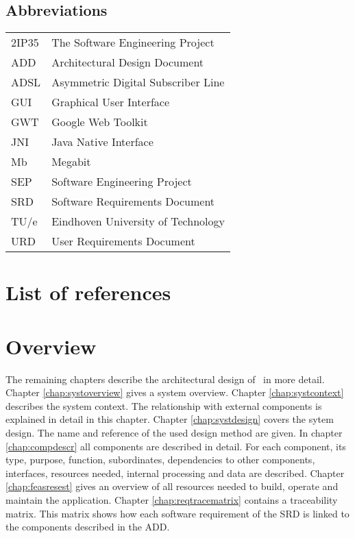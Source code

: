 \subsection{Abbreviations}
\begin{tabular}{l|l}
2IP35 & The Software Engineering Project \\
ADD & Architectural Design Document \\
ADSL & Asymmetric Digital Subscriber Line \\
GUI & Graphical User Interface \\
GWT & Google Web Toolkit \\
JNI & Java Native Interface \\
Mb & Megabit \\
SEP   & Software Engineering Project \\
SRD   & Software Requirements Document \\
TU/e  & Eindhoven University of Technology \\
URD   & User Requirements Document \\
\end{tabular}

\section{List of references}


\section{Overview}
The remaining chapters describe the architectural design of \projectname\ in more detail. Chapter \ref{chap:systoverview} gives a system overview. Chapter \ref{chap:systcontext} describes the system context. The relationship with external components is explained in detail in this chapter. Chapter \ref{chap:systdesign} covers the sytem design. The name and reference of the used design method are given.
In chapter \ref{chap:compdescr} all components are described in detail. For each component, its type, purpose, function, subordinates, dependencies to other components, interfaces, resources needed, internal processing and  data are described. Chapter \ref{chap:feasresest} gives an overview of all resources needed to build, operate and maintain the application. Chapter \ref{chap:reqtracematrix} contains a traceability matrix. This matrix shows how each software requirement of the SRD \cite{srd} is linked to the components described in the ADD.